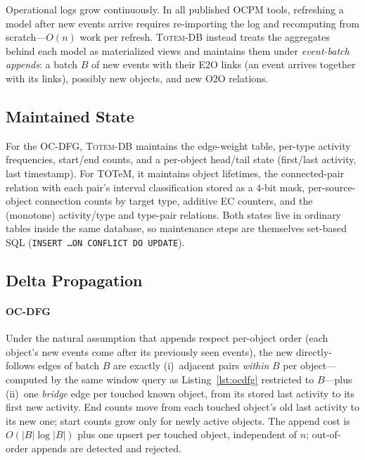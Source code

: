 \documentclass[sigconf, nonacm]{acmart}
\newcommand{\sys}{\textsc{Totem-DB}\xspace}
\begin{document}
Operational logs grow continuously. In all published OCPM tools, refreshing a model after new events arrive requires re-importing the log and recomputing from scratch---$O(n)$ work per refresh. \sys instead treats the aggregates behind each model as materialized views and maintains them under \emph{event-batch appends}: a batch $B$ of new events with their E2O links (an event arrives together with its links), possibly new objects, and new O2O relations.

\subsection{Maintained State}

For the OC-DFG, \sys maintains the edge-weight table, per-type activity frequencies, start/end counts, and a per-object head/tail state (first/last activity, last timestamp). For TOTeM, it maintains object lifetimes, the connected-pair relation with each pair's interval classification stored as a 4-bit mask, per-source-object connection counts by target type, additive EC counters, and the (monotone) activity/type and type-pair relations. Both states live in ordinary tables inside the same database, so maintenance steps are themselves set-based SQL (\texttt{INSERT \ldots ON CONFLICT DO UPDATE}).

\subsection{Delta Propagation}

\paragraph{OC-DFG} Under the natural assumption that appends respect per-object order (each object's new events come after its previously seen events), the new directly-follows edges of batch $B$ are exactly (i)~adjacent pairs \emph{within} $B$ per object---computed by the same window query as Listing~\ref{lst:ocdfg} restricted to $B$---plus (ii)~one \emph{bridge} edge per touched known object, from its stored last activity to its first new activity. End counts move from each touched object's old last activity to its new one; start counts grow only for newly active objects. The append cost is $O(|B| \log |B|)$ plus one upsert per touched object, independent of $n$; out-of-order appends are detected and rejected.
\end{document}
